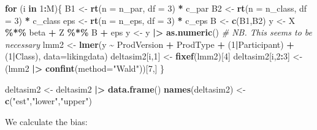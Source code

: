 \documentclass[
]{article}
\newenvironment{Shaded}{\begin{snugshade}}{\end{snugshade}}
\newcommand{\AttributeTok}[1]{\textcolor[rgb]{0.13,0.29,0.53}{#1}}
\newcommand{\CommentTok}[1]{\textcolor[rgb]{0.56,0.35,0.01}{\textit{#1}}}
\newcommand{\ControlFlowTok}[1]{\textcolor[rgb]{0.13,0.29,0.53}{\textbf{#1}}}
\newcommand{\DecValTok}[1]{\textcolor[rgb]{0.00,0.00,0.81}{#1}}
\newcommand{\FunctionTok}[1]{\textcolor[rgb]{0.13,0.29,0.53}{\textbf{#1}}}
\newcommand{\NormalTok}[1]{#1}
\newcommand{\OtherTok}[1]{\textcolor[rgb]{0.56,0.35,0.01}{#1}}
\newcommand{\SpecialCharTok}[1]{\textcolor[rgb]{0.81,0.36,0.00}{\textbf{#1}}}
\newcommand{\StringTok}[1]{\textcolor[rgb]{0.31,0.60,0.02}{#1}}
\begin{document}
\begin{Shaded}
\begin{Highlighting}[]
\ControlFlowTok{for}\NormalTok{ (i }\ControlFlowTok{in} \DecValTok{1}\SpecialCharTok{:}\NormalTok{M)\{}
\NormalTok{  B1 }\OtherTok{\textless{}{-}} \FunctionTok{rt}\NormalTok{(}\AttributeTok{n =}\NormalTok{ n\_par, }\AttributeTok{df =} \DecValTok{3}\NormalTok{) }\SpecialCharTok{*}\NormalTok{ c\_par}
\NormalTok{  B2 }\OtherTok{\textless{}{-}} \FunctionTok{rt}\NormalTok{(}\AttributeTok{n =}\NormalTok{ n\_class, }\AttributeTok{df =} \DecValTok{3}\NormalTok{) }\SpecialCharTok{*}\NormalTok{ c\_class}
\NormalTok{  eps }\OtherTok{\textless{}{-}} \FunctionTok{rt}\NormalTok{(}\AttributeTok{n =}\NormalTok{ n\_eps, }\AttributeTok{df =} \DecValTok{3}\NormalTok{) }\SpecialCharTok{*}\NormalTok{ c\_eps}
\NormalTok{  B }\OtherTok{\textless{}{-}} \FunctionTok{c}\NormalTok{(B1,B2)}
\NormalTok{  y }\OtherTok{\textless{}{-}}\NormalTok{ X }\SpecialCharTok{\%*\%}\NormalTok{ beta }\SpecialCharTok{+}\NormalTok{ Z }\SpecialCharTok{\%*\%}\NormalTok{ B }\SpecialCharTok{+}\NormalTok{ eps}
\NormalTok{  y }\OtherTok{\textless{}{-}}\NormalTok{ y }\SpecialCharTok{|\textgreater{}} \FunctionTok{as.numeric}\NormalTok{() }\CommentTok{\# NB. This seems to be necessary}
\NormalTok{  lmm2 }\OtherTok{\textless{}{-}} \FunctionTok{lmer}\NormalTok{(y }\SpecialCharTok{\textasciitilde{}}\NormalTok{ ProdVersion }\SpecialCharTok{+}\NormalTok{ ProdType }\SpecialCharTok{+}\NormalTok{ (}\DecValTok{1}\SpecialCharTok{|}\NormalTok{Participant) }\SpecialCharTok{+}\NormalTok{ (}\DecValTok{1}\SpecialCharTok{|}\NormalTok{Class), }\AttributeTok{data=}\NormalTok{likingdata)}
\NormalTok{  deltasim2[i,}\DecValTok{1}\NormalTok{] }\OtherTok{\textless{}{-}} \FunctionTok{fixef}\NormalTok{(lmm2)[}\DecValTok{4}\NormalTok{]}
\NormalTok{  deltasim2[i,}\DecValTok{2}\SpecialCharTok{:}\DecValTok{3}\NormalTok{] }\OtherTok{\textless{}{-}}\NormalTok{ (lmm2 }\SpecialCharTok{|\textgreater{}} \FunctionTok{confint}\NormalTok{(}\AttributeTok{method=}\StringTok{"Wald"}\NormalTok{))[}\DecValTok{7}\NormalTok{,]}
\NormalTok{\}}

\NormalTok{deltasim2 }\OtherTok{\textless{}{-}}\NormalTok{ deltasim2 }\SpecialCharTok{|\textgreater{}} \FunctionTok{data.frame}\NormalTok{()}
\FunctionTok{names}\NormalTok{(deltasim2) }\OtherTok{\textless{}{-}} \FunctionTok{c}\NormalTok{(}\StringTok{"est"}\NormalTok{,}\StringTok{"lower"}\NormalTok{,}\StringTok{"upper"}\NormalTok{)}
\end{Highlighting}
\end{Shaded}

We calculate the bias:

\begin{Shaded}
\end{Shaded}
\end{document}
